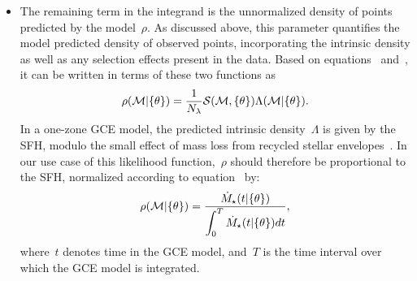 \documentclass[ms.tex]{subfiles}
\begin{document}
\begin{itemize}
	\item The remaining term in the integrand is the unnormalized density of
	points predicted by the model~$\rho$.
	As discussed above, this parameter quantifies the model predicted density
	of observed points, incorporating the intrinsic density as well as any
	selection effects present in the data.
	Based on equations~ and~, it can
	be written in terms of these two functions as
	\begin{equation}
	\rho(\mathcal{M} | \{\theta\}) = \frac{1}{N_\lambda}
	\mathcal{S}(\mathcal{M}, \{\theta\})
	\Lambda(\mathcal{M} | \{\theta\}).
	\end{equation}
	In a one-zone GCE model, the predicted intrinsic density~$\Lambda$ is given
	by the SFH, modulo the small effect of mass loss from recycled stellar
	envelopes~\citep[see discussion in, e.g., ][]{Weinberg2017}.
	In our use case of this likelihood function,~$\rho$ should therefore be
	proportional to the SFH, normalized according to
	equation~ by:
	\begin{equation}
	\rho(\mathcal{M} | \{\theta\}) = \frac{\displaystyle{
		\dot{M}_\star(t | \{\theta\})
	}}{\displaystyle{
		\int_0^T \dot{M}_\star(t | \{\theta\}) dt
	}},
	\end{equation}
	where~$t$ denotes time in the GCE model, and~$T$ is the time interval over
	which the GCE model is integrated.


\end{itemize}
\end{document}
